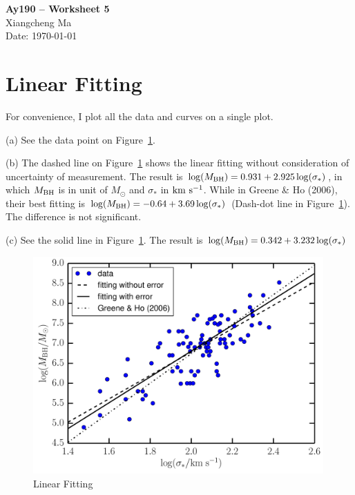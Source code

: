 \documentclass[11pt,letterpaper]{article}
\begin{document}
\begin{center}
\Large
{\bf Ay190 -- Worksheet 5} \\
\large
Xiangcheng Ma \\
Date: \today
\end{center}

\section*{Linear Fitting}
For convenience, I plot all the data and curves on a single plot.

(a) See the data point on Figure~\ref{fig}.

(b) The dashed line on Figure~\ref{fig} shows the linear fitting without consideration of uncertainty of measurement. The result is $\log(M_{\rm BH})=0.931+2.925\log(\sigma_*)$, in which $M_{\rm BH}$ is in unit of $M_{\odot}$ and $\sigma_*$ in $\rm km~s^{-1}$. While in Greene \& Ho (2006), their best fitting is 
$\log(M_{\rm BH})=-0.64+3.69\log(\sigma_*)$ (Dash-dot line in Figure~\ref{fig}). The difference is not significant.

(c) See the solid line in Figure~\ref{fig}. The result is $\log(M_{\rm BH})=0.342+3.232\log(\sigma_*)$

\begin{figure}[h]
\centering
\includegraphics[width={0.99\textwidth}]{fig.pdf}
\caption{Linear Fitting}
\label{fig}
\end{figure}
\end{document}
